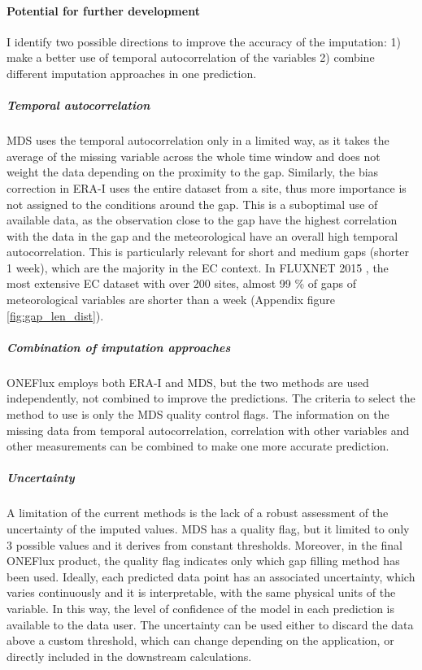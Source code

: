 \documentclass{article}
\begin{document}
\paragraph{Potential for further development} I identify two possible directions to improve the accuracy of the imputation:  1) make a better use of temporal autocorrelation of the variables 2) combine different imputation approaches in one prediction.

\subparagraph{Temporal autocorrelation} MDS uses the temporal autocorrelation only in a limited way, as it takes the average of the missing variable across the whole time window and does not weight the data depending on the proximity to the gap.  Similarly, the bias correction in ERA-I uses the entire dataset from a site, thus more importance is not assigned to the conditions around the gap.  This is a suboptimal use of available data, as the observation close to the gap have the highest correlation with the data in the gap and the meteorological have an overall high temporal autocorrelation. This is particularly relevant for short and medium gaps (shorter 1 week), which are the majority in the EC context.
In FLUXNET 2015 \cite{pastorello_fluxnet2015_2020}, the most extensive EC dataset with over 200 sites, almost 99 \% of gaps of meteorological variables are shorter than a week (Appendix figure \ref{fig:gap_len_dist}).

\subparagraph{Combination of imputation approaches} ONEFlux employs both ERA-I and MDS, but the two methods are used independently, not combined to improve the predictions. The criteria to select the method to use is only the MDS quality control flags. The information on the missing data from temporal autocorrelation, correlation with other variables and other measurements can be combined to make one more accurate prediction.

\subparagraph{Uncertainty} A limitation of the current methods is the lack of a robust assessment of the uncertainty of the imputed values. MDS has a quality flag, but it limited to only 3 possible values and it derives from constant thresholds. Moreover, in the final ONEFlux product, the quality flag indicates only which gap filling method has been used. Ideally, each predicted data point has an associated uncertainty, which varies continuously and it is interpretable, with the same physical units of the variable.  In this way, the level of confidence of the model in each prediction is available to the data user. The uncertainty can be used either to discard the data above a custom threshold, which can change depending on the application, or directly included in the downstream calculations.
\end{document}
